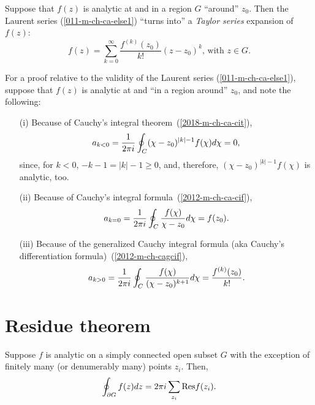 Suppose that $f(z)$ is analytic at and in a region $G$ ``around'' $z_0$.
Then the Laurent series (\ref{011-m-ch-ca-else1})
``turns into'' a {\em Taylor series}
expansion of $f(z)$:
\begin{equation}
f(z) =
\sum_{k=0}^\infty \frac{f^{(k)}(z_0)}{k!} (z - z_0)^k
\text{, with } z\in G
.
\label{2019-mm-ca-ts}
\end{equation}

{\color{OliveGreen}
\bproof
For a proof relative to the validity of the Laurent series (\ref{011-m-ch-ca-else1}),
suppose that $f(z)$ is analytic at and ``in a region around'' $z_0$,
and note the following:
\begin{itemize}

\item[(i)]
Because of Cauchy's integral theorem~(\ref{2018-m-ch-ca-cit}),
\begin{equation}
a_{k<0} =
{1\over 2\pi i}\oint_C(\chi -z_0)^{|k|-1}f(\chi )d\chi =0 ,
\end{equation}
since, for
$k<0$, $-k-1 = |k|-1\ge 0$, and, therefore,
$(\chi -z_0)^{|k|-1}f(\chi )$ is analytic, too.

\item[(ii)]
Because of Cauchy's integral formula~(\ref{2012-m-ch-ca-cif}),
\begin{equation}
a_{k=0} =
{1\over 2\pi i}\oint_C \frac{f(\chi )}{\chi -z_0}d\chi = f(z_0).
\end{equation}


\item[(iii)]
Because of the generalized Cauchy  integral formula (aka
Cauchy's differentiation formula)~(\ref{2012-m-ch-cagcif}),
\begin{equation}
a_{k>0} =
{1\over 2\pi i}\oint_C \frac{f(\chi )}{(\chi -z_0)^{k+1}} d\chi
= \frac{f^{(k)}(z_0)}{k!}.
\end{equation}

\end{itemize}

\eproof
}



 \section{Residue theorem}
\label{2021-mm-ch-ca-rt}


Suppose $f$ is analytic on a  simply connected open subset $G$
with the exception of finitely many (or denumerably many) points  $z_i$.
Then,
\begin{equation}
\oint_{\partial G} f(z)dz=2\pi i \sum_{z_i} {\rm Res}f(z_i) .
\end{equation}


